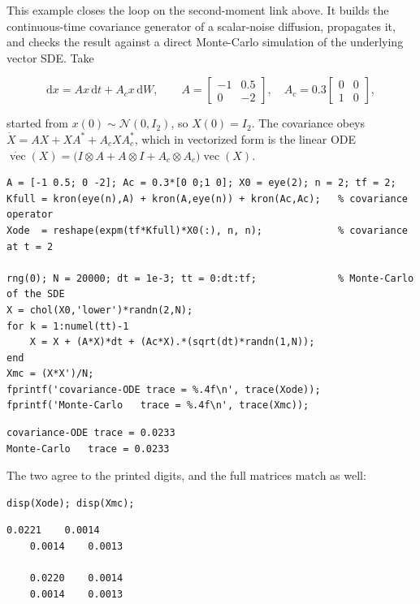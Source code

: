 \documentclass[11pt,oneside]{report}
\begin{document}
This example closes the loop on the second-moment link above. It builds the
continuous-time covariance generator of a scalar-noise diffusion, propagates it,
and checks the result against a direct Monte-Carlo simulation of the underlying
vector SDE. Take

\[\mathrm{d}x=A x\,\mathrm{d}t+A_c x\,\mathrm{d}W,\qquad A=\begin{bmatrix}-1&0.5\\0&-2\end{bmatrix},\quad A_c=0.3\begin{bmatrix}0&0\\1&0\end{bmatrix},\]

started from \(x(0)\sim\mathcal{N}(0,I_2)\), so \(X(0)=I_2\). The covariance obeys
\(\dot X=A X+X A^{*}+A_c X A_c^{*}\), which in vectorized form is the linear ODE
\(\dot{\operatorname{vec}}(X)=\big(I\otimes A+A\otimes I+A_c\otimes A_c\big)\operatorname{vec}(X)\).

\begin{lstlisting}[style=matlabstyle]
A = [-1 0.5; 0 -2]; Ac = 0.3*[0 0;1 0]; X0 = eye(2); n = 2; tf = 2;
Kfull = kron(eye(n),A) + kron(A,eye(n)) + kron(Ac,Ac);   % covariance operator
Xode  = reshape(expm(tf*Kfull)*X0(:), n, n);             % covariance at t = 2

rng(0); N = 20000; dt = 1e-3; tt = 0:dt:tf;              % Monte-Carlo of the SDE
X = chol(X0,'lower')*randn(2,N);
for k = 1:numel(tt)-1
    X = X + (A*X)*dt + (Ac*X).*(sqrt(dt)*randn(1,N));
end
Xmc = (X*X')/N;
fprintf('covariance-ODE trace = %.4f\n', trace(Xode));
fprintf('Monte-Carlo   trace = %.4f\n', trace(Xmc));
\end{lstlisting}

\begin{lstlisting}[style=outputstyle]
covariance-ODE trace = 0.0233
Monte-Carlo   trace = 0.0233
\end{lstlisting}

The two agree to the printed digits, and the full matrices match as well:

\begin{lstlisting}[style=matlabstyle]
disp(Xode); disp(Xmc);
\end{lstlisting}

\begin{lstlisting}[style=outputstyle]
    0.0221    0.0014
    0.0014    0.0013

    0.0220    0.0014
    0.0014    0.0013
\end{lstlisting}
\end{document}
